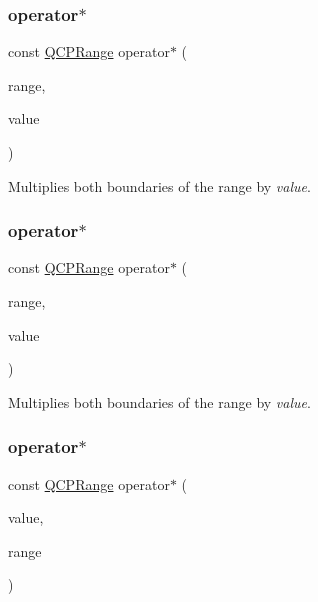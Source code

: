 \subsubsection{\texorpdfstring{operator$\ast$}{operator*}\hspace{0.1cm}{\footnotesize\ttfamily [1/4]}}
{\footnotesize\ttfamily const \hyperlink{class_q_c_p_range}{Q\+C\+P\+Range} operator$\ast$ (\begin{DoxyParamCaption}\item[{const \hyperlink{class_q_c_p_range}{Q\+C\+P\+Range} \&}]{range,  }\item[{double}]{value }\end{DoxyParamCaption})\hspace{0.3cm}{\ttfamily [friend]}}

Multiplies both boundaries of the range by {\itshape value}. \mbox{\label{class_q_c_p_range_a558b1248ff6a9e41fd5b2630555a8acc}} 
\subsubsection{\texorpdfstring{operator$\ast$}{operator*}\hspace{0.1cm}{\footnotesize\ttfamily [2/4]}}
{\footnotesize\ttfamily const \hyperlink{class_q_c_p_range}{Q\+C\+P\+Range} operator$\ast$ (\begin{DoxyParamCaption}\item[{const \hyperlink{class_q_c_p_range}{Q\+C\+P\+Range} \&}]{range,  }\item[{double}]{value }\end{DoxyParamCaption})\hspace{0.3cm}{\ttfamily [friend]}}

Multiplies both boundaries of the range by {\itshape value}. \mbox{\label{class_q_c_p_range_a5cb2332f6957021f47cc768089f4f090}} 
\subsubsection{\texorpdfstring{operator$\ast$}{operator*}\hspace{0.1cm}{\footnotesize\ttfamily [3/4]}}
{\footnotesize\ttfamily const \hyperlink{class_q_c_p_range}{Q\+C\+P\+Range} operator$\ast$ (\begin{DoxyParamCaption}\item[{double}]{value,  }\item[{const \hyperlink{class_q_c_p_range}{Q\+C\+P\+Range} \&}]{range }\end{DoxyParamCaption})\hspace{0.3cm}{\ttfamily [friend]}}


